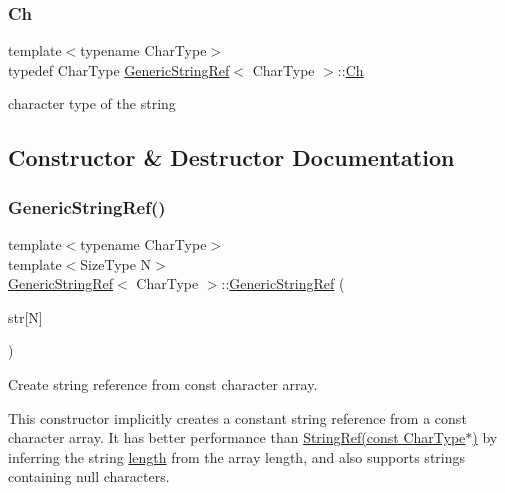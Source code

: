 \subsubsection{\texorpdfstring{Ch}{Ch}}
{\footnotesize\ttfamily template$<$typename Char\+Type$>$ \\
typedef Char\+Type \hyperlink{structGenericStringRef}{Generic\+String\+Ref}$<$ Char\+Type $>$\+::\hyperlink{structGenericStringRef_a16908c3fce41be380061330c14ba2140}{Ch}}



character type of the string 



\subsection{Constructor \& Destructor Documentation}
\mbox{\label{structGenericStringRef_aae0c070f914d2486a560150a927c22dc}} 
\subsubsection{\texorpdfstring{Generic\+String\+Ref()}{GenericStringRef()}\hspace{0.1cm}{\footnotesize\ttfamily [1/5]}}
{\footnotesize\ttfamily template$<$typename Char\+Type$>$ \\
template$<$Size\+Type N$>$ \\
\hyperlink{structGenericStringRef}{Generic\+String\+Ref}$<$ Char\+Type $>$\+::\hyperlink{structGenericStringRef}{Generic\+String\+Ref} (\begin{DoxyParamCaption}\item[{const Char\+Type(\&)}]{str\mbox{[}\+N\mbox{]} }\end{DoxyParamCaption})\hspace{0.3cm}{\ttfamily [inline]}}



Create string reference from {\ttfamily const} character array. 

This constructor implicitly creates a constant string reference from a {\ttfamily const} character array. It has better performance than \hyperlink{structGenericStringRef_aa6b9fd9f6aa49405a574c362ba9af6b5}{String\+Ref(const Char\+Type$\ast$)} by inferring the string \hyperlink{structGenericStringRef_a4a96d618744ad73f766a1551b1d517fe}{length} from the array length, and also supports strings containing null characters.


